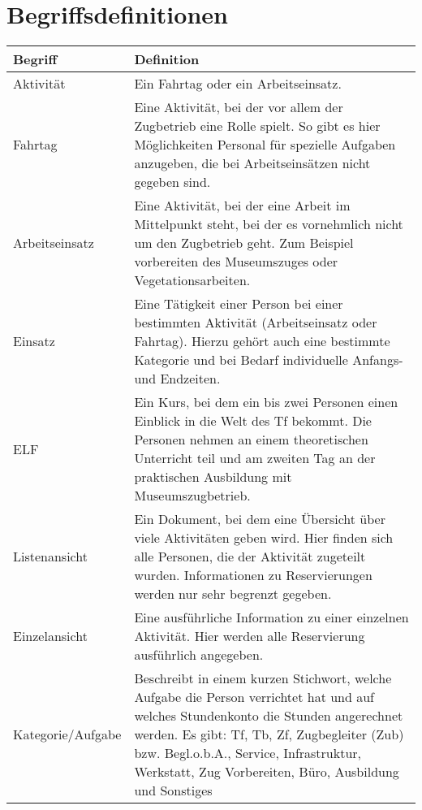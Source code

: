 \section{Begriffsdefinitionen}\label{glossar}
\begin{tabularx}{\textwidth}{l|X}
  Begriff	& Definition \\
  \hline
  \hline
  Aktivität &
    Ein Fahrtag oder ein Arbeitseinsatz. \\
  \hline
  Fahrtag	&
    Eine Aktivität, bei der vor allem der Zugbetrieb eine Rolle spielt.
    So gibt es hier Möglichkeiten Personal für spezielle Aufgaben anzugeben, die bei Arbeitseinsätzen nicht gegeben sind.\\
  \hline
  Arbeitseinsatz &
    Eine Aktivität, bei der eine Arbeit im Mittelpunkt steht, bei der es vornehmlich nicht um den Zugbetrieb geht.
    Zum Beispiel vorbereiten des Museumszuges oder Vegetationsarbeiten. \\
  \hline
  Einsatz &
    Eine Tätigkeit einer Person bei einer bestimmten Aktivität (Arbeitseinsatz oder Fahrtag).
    Hierzu gehört auch eine bestimmte Kategorie und bei Bedarf individuelle Anfangs- und Endzeiten.
     \\
  \hline
  ELF &
    Ein Kurs, bei dem ein bis zwei Personen einen Einblick in die Welt des Tf bekommt.
    Die Personen nehmen an einem theoretischen Unterricht teil und am zweiten Tag an der praktischen Ausbildung mit Museumszugbetrieb.\\
  \hline
  Listenansicht &
    Ein Dokument, bei dem eine Übersicht über viele Aktivitäten geben wird.
    Hier finden sich alle Personen, die der Aktivität zugeteilt wurden.
    Informationen zu Reservierungen werden nur sehr begrenzt gegeben. \\
  \hline
  Einzelansicht &
  	Eine ausführliche Information zu einer einzelnen Aktivität.
    Hier werden alle Reservierung ausführlich angegeben. \\
  \hline
  Kategorie/Aufgabe &
  	Beschreibt in einem kurzen Stichwort, welche Aufgabe die Person verrichtet hat und auf welches Stundenkonto die Stunden angerechnet werden. \newline
    Es gibt: Tf, Tb, Zf, Zugbegleiter (Zub) bzw. Begl.o.b.A., Service, Infrastruktur, Werkstatt, Zug Vorbereiten, Büro, Ausbildung und Sonstiges
\end{tabularx}
